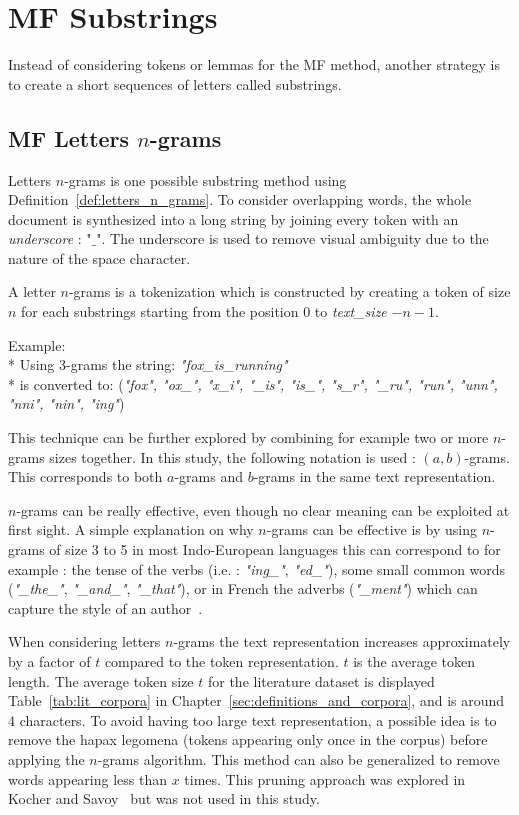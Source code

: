 \section{MF Substrings \label{sec:substrings}}

Instead of considering tokens or lemmas for the MF method, another strategy is to create a short sequences of letters called substrings.

\subsection{MF Letters $n$-grams}

Letters $n$-grams is one possible substring method using Definition~\ref{def:letters_n_grams}.
To consider overlapping words, the whole document is synthesized into a long string by joining every token with an \textit{underscore} : "$\_$".
The underscore is used to remove visual ambiguity due to the nature of the space character.

\begin{definition}
  A letter $n$-grams is a tokenization which is constructed by creating a token of size $n$ for each substrings starting from the position $0$ to \textit{text\_size} $- n - 1$.

  Example: \\*
  Using 3-grams the string: \textit{"fox\_is\_running"} \\*
  is converted to: (\textit{"fox", "ox\_", "x\_i", "\_is", "is\_", "s\_r", "\_ru", "run", "unn", "nni", "nin", "ing"})
\end{definition}

This technique can be further explored by combining for example two or more $n$-grams sizes together.
In this study, the following notation is used : $(a, b)$-grams.
This corresponds to both $a$-grams and $b$-grams in the same text representation.

$n$-grams can be really effective, even though no clear meaning can be exploited at first sight.
A simple explanation on why $n$-grams can be effective is by using $n$-grams of size 3 to 5 in most Indo-European languages this can correspond to for example : the tense of the verbs (i.e. : \textit{"ing\_"}, \textit{"ed\_"}), some small common words (\textit{"\_the\_"}, \textit{"\_and\_"}, \textit{"\_that"}), or in French the adverbs (\textit{"\_ment"}) which can capture the style of an author~\cite{ngrams_authorship}.

When considering letters $n$-grams the text representation increases approximately by a factor of $t$ compared to the token representation.
$t$ is the average token length.
The average token size $t$ for the literature dataset is displayed Table~\ref{tab:lit_corpora} in Chapter~\ref{sec:definitions_and_corpora}, and is around $4$ characters.
To avoid having too large text representation, a possible idea is to remove the hapax legomena (tokens appearing only once in the corpus) before applying the $n$-grams algorithm.
This method can also be generalized to remove words appearing less than $x$ times.
This pruning approach was explored in Kocher and Savoy~\cite{kocher_linking} but was not used in this study.


